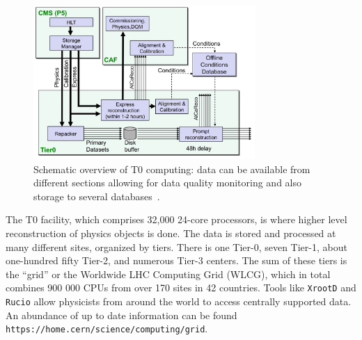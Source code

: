 \begin{figure}[ht!b]
\label{fig:t0}
  \centering
\includegraphics[width=0.75\textwidth]{figures/Tier0.png}    
    \caption{Schematic overview of T0 computing: data can be available from different sections allowing for data quality monitoring and also storage to several databases~\cite{Hufnagel:1319049}. }
\end{figure}

The T0 facility, which comprises 32,000 24-core processors, is where higher level reconstruction of physics objects is done.  
The data is stored and processed at many different sites, organized by tiers. There is one Tier-0, seven Tier-1, about one-hundred fifty Tier-2, and numerous Tier-3 centers. The sum of these tiers is the ``grid'' or the Worldwide LHC Computing Grid (WLCG), which in total combines 900 000 CPUs from over 170 sites in 42 countries. Tools like \texttt{XrootD} and \texttt{Rucio} allow physicists from around the world to access centrally supported data. An abundance of up to date information can be found \texttt{https://home.cern/science/computing/grid}. 



